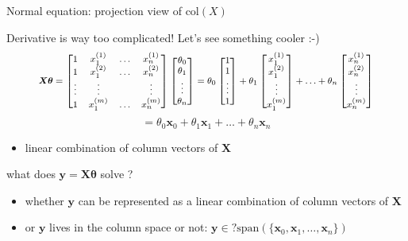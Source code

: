 \documentclass[ignorenonframetext,]{beamer}
\providecommand{\tightlist}{%
  \setlength{\itemsep}{0pt}\setlength{\parskip}{0pt}}
\newcommand{\vv}[1]{\boldsymbol{#1}}
\begin{document}
\begin{frame}{Normal equation: projection view of \(\text{col}(X)\)}
\protect\hypertarget{normal-equation-projection-view-of-textcolx}{}

Derivative is way too complicated! Let's see something cooler :-)
\begin{align*}\footnotesize \vv{X\theta} = \begin{bmatrix}
1 & x_1^{(1)} & \ldots & x_{n}^{(1)}\\
1 & x_1^{(2)} & \ldots & x_{n}^{(2)} \\
\vdots & \vdots & & \vdots \\
1 & x_1^{(m)} & \ldots & x_{n}^{(m)}
\end{bmatrix} \begin{bmatrix} \theta_0\\ \theta_1\\ \vdots \\ \theta_n\end{bmatrix} = \theta_0 \begin{bmatrix}1 \\ 1\\ \vdots \\ 1\end{bmatrix}+ \theta_1 \begin{bmatrix}x^{(1)}_1 \\ x^{(2)}_1\\ \vdots\\ x^{(m)}_1\end{bmatrix} +\ldots+  \theta_n \begin{bmatrix}x^{(1)}_n \\ x^{(2)}_n\\ \vdots\\ x^{(m)}_n\end{bmatrix} \end{align*}
\[=\theta_0 \vv{x}_0 + \theta_{1} \vv{x}_1 +\ldots + \theta_n \vv{x}_n\]

\begin{itemize}
\tightlist
\item
  linear combination of column vectors of \(\vv{X}\)
\end{itemize}

\bigskip

what does \(\vv{y} = \vv{X\theta}\) solve ?

\begin{itemize}
\tightlist
\item
  whether \(\vv{y}\) can be represented as a linear combination of
  column vectors of \(\vv{X}\)
\item
  or \(\vv{y}\) lives in the column space or not:
  \(\vv{y} \in? \text{span}(\{\vv{x}_0, \vv{x}_1, \ldots, \vv{x}_n\})\)
\end{itemize}

\end{frame}
\end{document}
